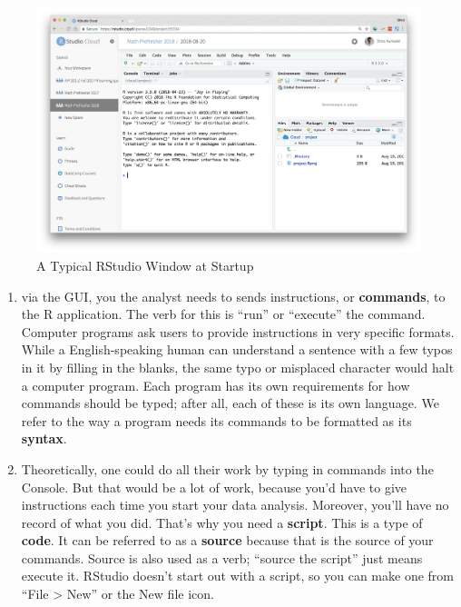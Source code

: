 \documentclass[]{book}
\theoremstyle{definition}
\theoremstyle{definition}
\theoremstyle{definition}
\theoremstyle{remark}
\begin{document}
\begin{figure}
\centering
\includegraphics{images/11_1_rstudio-startup.png}
\caption{A Typical RStudio Window at Startup}
\end{figure}

\begin{enumerate}
\def\labelenumi{\arabic{enumi}.}
\setcounter{enumi}{2}
\item
  via the GUI, you the analyst needs to sends instructions, or \textbf{commands}, to the R application. The verb for this is ``run'' or ``execute'' the command. Computer programs ask users to provide instructions in very specific formats. While a English-speaking human can understand a sentence with a few typos in it by filling in the blanks, the same typo or misplaced character would halt a computer program. Each program has its own requirements for how commands should be typed; after all, each of these is its own language. We refer to the way a program needs its commands to be formatted as its \textbf{syntax}.
\item
  Theoretically, one could do all their work by typing in commands into the Console. But that would be a lot of work, because you'd have to give instructions each time you start your data analysis. Moreover, you'll have no record of what you did. That's why you need a \textbf{script}. This is a type of \textbf{code}. It can be referred to as a \textbf{source} because that is the source of your commands. Source is also used as a verb; ``source the script'' just means execute it. RStudio doesn't start out with a script, so you can make one from ``File \textgreater{} New'' or the New file icon.
\end{enumerate}
\end{document}
